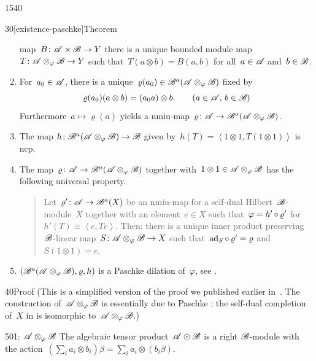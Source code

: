 \begin{parsec}{1540}
\begin{point}{30}[existence-paschke]{Theorem}
\begin{enumerate}
    map~$B \colon \scrA \times \scrB \to Y$
    there is a unique bounded
    module map~$T\colon \scrA \otimes_\varphi \scrB \to Y$
    such that~$T(a \otimes b) = B(a,b)$ for all~$a \in \scrA$ and~$b \in \scrB$.
\item
    For~$a_0 \in \mathscr{A}$,
    there is a unique~$\varrho(a_0) \in \mathscr{B}^a(\mathscr{A} \otimes_\varphi \mathscr{B})$
            fixed by
            \begin{equation*}
                \varrho(a_0)(a\otimes b) = (a_0 a)\otimes b.
                    \text{\qquad ($a\in \mathscr{A}$, $b \in \mathscr{B}$)}
            \end{equation*}
    Furthermore~$a \mapsto \varrho(a)$
        yields a
        nmiu-map~$\varrho\colon \mathscr{A} \to \mathscr{B}^a(\mathscr{A}\otimes_\varphi \mathscr{B})$.
\item
    The map
    $h\colon \mathscr{B}^a(\mathscr{A}\otimes_\varphi\mathscr{B}) \to \mathscr{B}$
    given by~$h(T) =\left<1 \otimes 1, T(1 \otimes 1)\right>$
    is ncp.
\item
The map~$\varrho \colon \mathscr{A} \to \mathscr{B}^a(\mathscr{A} \otimes_\varphi \mathscr{B})$
    together with~$1\otimes 1 \in \mathscr{A} \otimes_\varphi \mathscr{B}$
    has the following universal property.
\begin{quote}
Let~$\varrho'\colon \mathscr{A} \to \mathscr{B}^a(X)$
    be an nmiu-map
    for a self-dual Hilbert~$\mathscr{B}$-module~$X$
    together with an element~$e \in X$
    such that~$\varphi  = h' \mathop{\circ} \varrho'$
        for~$h'(T) \equiv \left<e,T e\right>$.
Then: there is a unique
        inner product preserving~$\mathscr{B}$-linear
        map~$S \colon \mathscr{A}\otimes_\varphi\mathscr{B} \to X$
        such that~$\mathrm{ad}_S \mathop{\circ} \varrho' = \varrho$
        and~$S( 1\otimes 1) = e$.
\end{quote}
\item
$(\mathscr{B}^a(\mathscr{A} \otimes_\varphi \mathscr{B}), \varrho, h)$
        is a Paschke dilation of~$\varphi$, see .
\end{enumerate}
\spacingfix{}
\begin{point}{40}{Proof}%
(This is a simplified version of the proof
    we published earlier in~\cite{wwpaschke}.
The construction of~$\mathscr{A} \otimes_\varphi \mathscr{B}$
    is essentially due to Paschke \cite[thm.~5.2]{paschke}:
    the self-dual completion of~$X$ in \cite[thm.~5.2]{paschke}
    is isomorphic to~$\mathscr{A} \otimes_\varphi \mathscr{B}$.)
\begin{point}{50}{1: $\mathscr{A} \otimes_\varphi \mathscr{B}$}%
The algebraic tensor product~$\mathscr{A} \odot \mathscr{B}$
    is a right $\mathscr{B}$-module
with the action~$(\sum_i a_i \otimes b_i)\beta = \sum_i a_i \otimes(b_i\beta)$.

\end{point}
\end{point}
\end{point}
\end{parsec}

